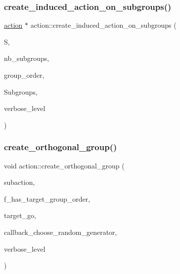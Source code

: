 \subsubsection{\texorpdfstring{create\+\_\+induced\+\_\+action\+\_\+on\+\_\+subgroups()}{create\_induced\_action\_on\_subgroups()}}
{\footnotesize\ttfamily \mbox{\hyperlink{classaction}{action}} $\ast$ action\+::create\+\_\+induced\+\_\+action\+\_\+on\+\_\+subgroups (\begin{DoxyParamCaption}\item[{\mbox{\hyperlink{classsims}{sims}} $\ast$}]{S,  }\item[{\mbox{\hyperlink{galois_8h_a09fddde158a3a20bd2dcadb609de11dc}{I\+NT}}}]{nb\+\_\+subgroups,  }\item[{\mbox{\hyperlink{galois_8h_a09fddde158a3a20bd2dcadb609de11dc}{I\+NT}}}]{group\+\_\+order,  }\item[{\mbox{\hyperlink{classsubgroup}{subgroup}} $\ast$$\ast$}]{Subgroups,  }\item[{\mbox{\hyperlink{galois_8h_a09fddde158a3a20bd2dcadb609de11dc}{I\+NT}}}]{verbose\+\_\+level }\end{DoxyParamCaption})}

\mbox{\label{classaction_a9ec9857e52b35c91c52964a1c5701128}} 
\subsubsection{\texorpdfstring{create\+\_\+orthogonal\+\_\+group()}{create\_orthogonal\_group()}}
{\footnotesize\ttfamily void action\+::create\+\_\+orthogonal\+\_\+group (\begin{DoxyParamCaption}\item[{\mbox{\hyperlink{classaction}{action}} $\ast$}]{subaction,  }\item[{\mbox{\hyperlink{galois_8h_a09fddde158a3a20bd2dcadb609de11dc}{I\+NT}}}]{f\+\_\+has\+\_\+target\+\_\+group\+\_\+order,  }\item[{\mbox{\hyperlink{classlonginteger__object}{longinteger\+\_\+object}} \&}]{target\+\_\+go,  }\item[{void($\ast$)(\mbox{\hyperlink{galois_8h_a09fddde158a3a20bd2dcadb609de11dc}{I\+NT}} iteration, \mbox{\hyperlink{galois_8h_a09fddde158a3a20bd2dcadb609de11dc}{I\+NT}} $\ast$\mbox{\hyperlink{simeon_8_c_aec1406935bdb1fee3561fcb840964100}{Elt}}, void $\ast$data, \mbox{\hyperlink{galois_8h_a09fddde158a3a20bd2dcadb609de11dc}{I\+NT}} \mbox{\hyperlink{simeon_8_c_a818073fbcc2f439e7c56952f67386122}{verbose\+\_\+level}})}]{callback\+\_\+choose\+\_\+random\+\_\+generator,  }\item[{\mbox{\hyperlink{galois_8h_a09fddde158a3a20bd2dcadb609de11dc}{I\+NT}}}]{verbose\+\_\+level }\end{DoxyParamCaption})}

